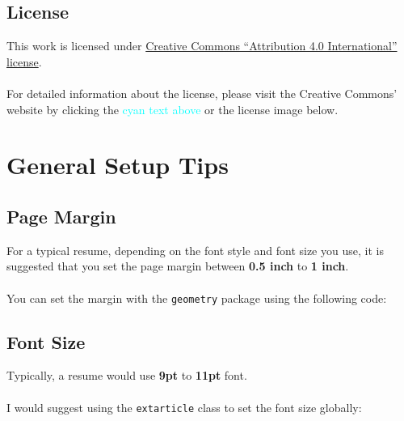 \documentclass[a4paper, 10pt]{article}
\begin{document}
\subsection{License}
This work is licensed under
\href{https://creativecommons.org/licenses/by/4.0/}{Creative Commons
``Attribution 4.0 International'' license}.\\
\\
For detailed information about the license, please visit the Creative Commons'
website by clicking the \textcolor{Cyan}{cyan text above} or the license image
below.
\\

\begin{flushright}
    \doclicenseImage
\end{flushright}

\newpage

\section{General Setup Tips}

\subsection{Page Margin}
For a typical resume, depending on the font style and font size you use, it is
suggested that you set the page margin between {\bf 0.5 inch} to {\bf 1 inch}.\\
~\\
You can set the margin with the {\tt geometry} package using the following code:

\begin{codebox}[title = Page Margin]
    \usepackage[margin = 0.5in]{geometry}
\end{codebox}

\vspace{1cm}

\subsection{Font Size}
Typically, a resume would use {\bf 9pt} to {\bf 11pt} font.\\
~\\
I would suggest using the {\tt extarticle} class to set the font size globally:

\end{document}
